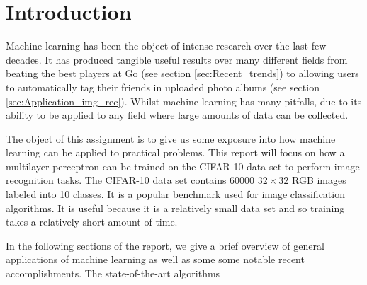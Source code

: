 \section{Introduction}
    \pagestyle{tom}

Machine learning has been the object of intense research over the last few decades. It has produced tangible useful results over many different fields from beating the best players at Go (see section \ref{sec:Recent_trends}) to allowing users to automatically tag their friends in uploaded photo albums (see section \ref{sec:Application_img_rec}). Whilst machine learning has many pitfalls, due to its ability to be applied to any field where large amounts of data can be collected.

The object of this assignment is to give us some exposure into how machine learning can be applied to practical problems. This report will focus on how a multilayer perceptron can be trained on the CIFAR-10 data set to perform image recognition tasks. The CIFAR-10 data set contains 60000 $32\times32$ RGB images labeled into 10 classes. It is a popular benchmark used for image classification algorithms. It is useful because it is a relatively small data set and so training takes a relatively short amount of time.

In the following sections of the report, we give a brief overview of general applications of machine learning as well as some some notable recent accomplishments. The state-of-the-art algorithms
